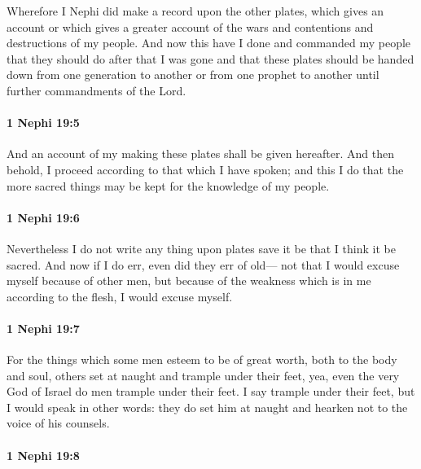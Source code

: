 			Wherefore I Nephi did make a record upon the other plates,
			which gives an account or which gives a greater account
			of the wars and contentions and destructions of my people.
			And now this have I done and commanded my people
			that they should do after that I was gone
			and that these plates should be handed down
			from one generation to another or from one prophet to another
			until further commandments of the Lord.

		\paragraph{1 Nephi 19:5} %
			\label{1NEPHI-19-5}

			And an account of my making these plates shall be given hereafter.
			And then behold, I proceed according to that which I have spoken;
			and this I do that the more sacred things may be kept
			for the knowledge of my people.

		\paragraph{1 Nephi 19:6} %
			\label{1NEPHI-19-6}

			Nevertheless I do not write any thing upon plates
			save it be that I think it be sacred.
			And now if I do err,
			even did they err of old---
			not that I would excuse myself because of other men,
			but because of the weakness which is in me according to the flesh,
			I would excuse myself.

		\paragraph{1 Nephi 19:7} %
			\label{1NEPHI-19-7}

			For the things which some men esteem to be of great worth,
			both to the body and soul,
			others set at naught and trample under their feet,
			yea, even the very God of Israel do men trample under their feet.
			I say trample under their feet,
			but I would speak in other words:
			they do set him at naught and hearken not to the voice of his counsels.

		\paragraph{1 Nephi 19:8} %
			\label{1NEPHI-19-8}

